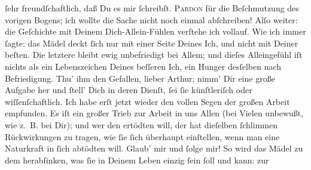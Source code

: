 \begin{ledgroupsized}[t]{13cm}
               ſehr freundſchaftlich, daß Du es mir ſchreibſt.\pend
           \pstart
           {\pb}\textsc{Pardon} für die Beſchmutzung des vorigen Bogens; ich wollte
               die Sache nicht noch einmal abſchreiben!\pend
           \pstart
           Alſo weiter: die Geſchichte mit Deinem Dich-Allein-Fühlen verſtehe ich vollauf. Wie
               ich immer ſagte: das Mädel deckt ſich nur mit einer Seite Deines Ich, und nicht
               mit Deiner beſten. Die letztere bleibt ewig unbefriedigt bei Allem; und dieſes
               Alleingefühl iſt nichts als ein Lebenszeichen Deines beſſeren Ich, ein Hunger
               desſelben nach Befriedigung. Thu’ ihm den Gefallen, lieber Arthur; nimm’ Dir eine
               große Aufgabe her und ſtell’ Dich in deren Dienſt, ſei ſie künſtleriſch oder
               wiſſenſchaftlich. Ich habe erſt jetzt wieder den vollen Segen der großen Arbeit
               empfunden. Es iſt ein großer Trieb zur {\pb}Arbeit in
               uns Allen (bei Vielen unbewußt, wie z. B. bei Dir); und wer den  ertödten will, der hat dieſelben ſchlimmen
               Rückwirkungen zu tragen, wie ſie ſich überhaupt einſtellen, wenn man eine Naturkraft
               in ſich abtödten will. Glaub’ mir und ſolge mir! So wird das Mädel zu dem herabſinken, was
               ſie in Deinem Leben einzig ſein ſoll und kann: zur \label{K_L02661-2v}
\end{ledgroupsized}
